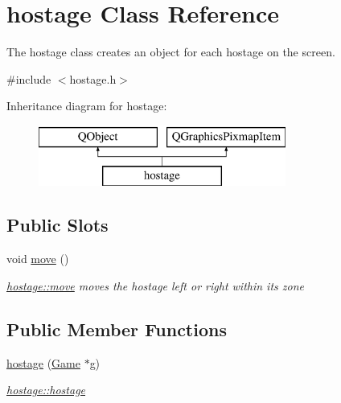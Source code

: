 \hypertarget{classhostage}{}\section{hostage Class Reference}
\label{classhostage}


The hostage class creates an object for each hostage on the screen.  




{\ttfamily \#include $<$hostage.\+h$>$}

Inheritance diagram for hostage\+:\begin{figure}[H]
\begin{center}
\leavevmode
\includegraphics[height=2.000000cm]{classhostage}
\end{center}
\end{figure}
\subsection*{Public Slots}
\begin{DoxyCompactItemize}
\item 
\hypertarget{classhostage_a5f63e03a71d6cee9c7253efd6614d66a}{}void \hyperlink{classhostage_a5f63e03a71d6cee9c7253efd6614d66a}{move} ()\label{classhostage_a5f63e03a71d6cee9c7253efd6614d66a}

\begin{DoxyCompactList}\small\item\em \hyperlink{classhostage_a5f63e03a71d6cee9c7253efd6614d66a}{hostage\+::move} moves the hostage left or right within its zone \end{DoxyCompactList}\end{DoxyCompactItemize}
\subsection*{Public Member Functions}
\begin{DoxyCompactItemize}
\item 
\hyperlink{classhostage_a289f13eb03abb9eb0d683d51faf292fc}{hostage} (\hyperlink{class_game}{Game} $\ast$g)
\begin{DoxyCompactList}\small\item\em \hyperlink{classhostage_a289f13eb03abb9eb0d683d51faf292fc}{hostage\+::hostage} \end{DoxyCompactList}\end{DoxyCompactItemize}


